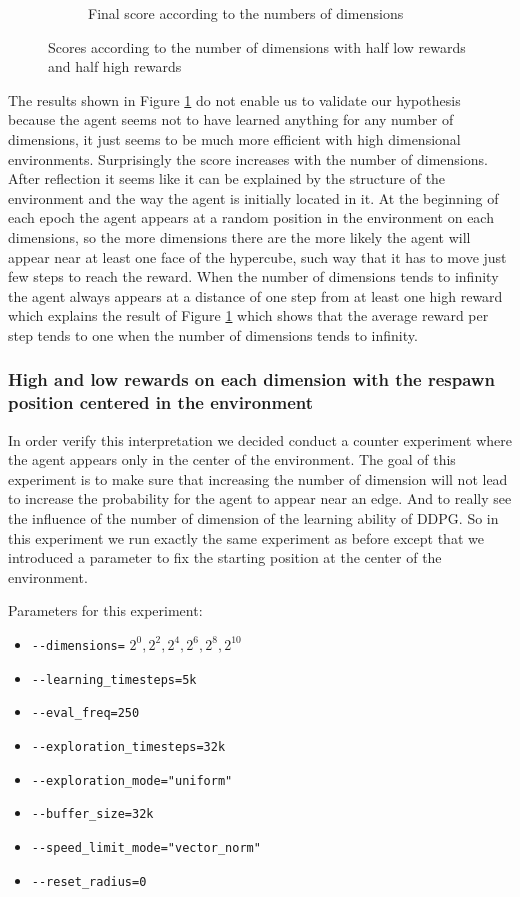 \documentclass{article}
\begin{document}
\begin{figure}[H]
\begin{subfigure}[b]{0.45\linewidth}
    \caption{Final score according to the numbers of dimensions}
  \end{subfigure}
  \caption{Scores according to the number of dimensions with half low rewards and half high rewards}
  \label{fig:curves_dimensions_half_norm}
\end{figure}

The results shown in Figure \ref{fig:curves_dimensions_half_norm} do not enable us to validate our hypothesis because the agent seems not to have learned anything for any number of dimensions, it just seems to be much more efficient with high dimensional environments. Surprisingly the score increases with the number of dimensions. After reflection it seems like it can be explained by the structure of the environment and the way the agent is initially located in it. At the beginning of each epoch the agent appears at a random position in the environment on each dimensions, so the more dimensions there are the more likely the agent will appear near at least one face of the hypercube, such way that it has to move just few steps to reach the reward. When the number of dimensions tends to infinity the agent always appears at a distance of one step from at least one high reward which explains the result of Figure \ref{fig:curves_dimensions_half_norm} which shows that the average reward per step tends to one when the number of dimensions tends to infinity.

\subsubsection{High and low rewards on each dimension with the respawn position centered in the environment}

In order verify this interpretation we decided conduct a counter experiment where the agent appears only in the center of the environment. The goal of this experiment is to make sure that increasing the number of dimension will not lead to increase the probability for the agent to appear near an edge. And to really see the influence of the number of dimension of the learning ability of DDPG. So in this experiment we run exactly the same experiment as before except that we introduced a parameter to fix the starting position at the center of the environment.

Parameters for this experiment:
\begin{itemize}
    \item[] \lstinline|--dimensions=| $2^0, 2^2, 2^4, 2^6, 2^8, 2^{10}$
    \item[] \lstinline|--learning_timesteps=5k|
    \item[] \lstinline|--eval_freq=250|
    \item[] \lstinline|--exploration_timesteps=32k|
    \item[] \lstinline|--exploration_mode="uniform"|
    \item[] \lstinline|--buffer_size=32k|
    \item[] \lstinline|--speed_limit_mode="vector_norm"|
    \item[] \lstinline|--reset_radius=0|
\end{itemize}
\end{document}

